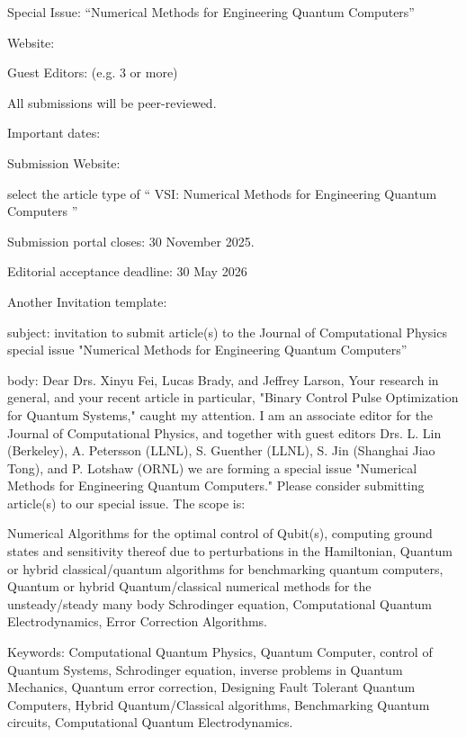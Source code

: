 \documentclass[]{article}
\begin{document}
Special Issue: ``Numerical Methods for Engineering Quantum Computers''
\par\noindent

Website: 
\par\noindent

Guest Editors: (e.g. 3 or more)
\par\noindent

All submissions will be peer-reviewed.
\par\noindent

Important dates:
\par\noindent

Submission Website: 
\par\noindent
select the article type of `` VSI: Numerical Methods for Engineering Quantum Computers '' 
\par\noindent

Submission portal closes: 30 November 2025.
\par\noindent

Editorial acceptance deadline: 30 May 2026
\par\noindent
Another Invitation template:
\par\noindent
subject: invitation to submit article(s) to the Journal of Computational Physics special issue "Numerical Methods for Engineering Quantum Computers''
\par\noindent
body: Dear Drs. Xinyu Fei, Lucas Brady, and Jeffrey Larson,
Your research in general, and your recent article in particular, "Binary Control Pulse Optimization for Quantum Systems," caught my attention.  I am an associate editor for the Journal of Computational Physics, and together with guest editors Drs.  L. Lin (Berkeley),   A. Petersson (LLNL), S. Guenther (LLNL), S. Jin (Shanghai Jiao Tong), and P. Lotshaw (ORNL) we are forming a special issue "Numerical Methods for Engineering Quantum Computers." Please consider submitting article(s) to our special issue.  The scope is:

Numerical Algorithms for the optimal control of Qubit(s), computing ground states and sensitivity thereof due to perturbations in the Hamiltonian, Quantum or hybrid classical/quantum algorithms for benchmarking quantum computers, Quantum or hybrid Quantum/classical numerical methods for the unsteady/steady many body Schrodinger equation, Computational Quantum Electrodynamics, Error Correction Algorithms.

Keywords:
Computational Quantum Physics, Quantum Computer, control of Quantum Systems, Schrodinger equation, inverse problems in Quantum Mechanics, Quantum error correction, Designing Fault Tolerant Quantum Computers, Hybrid Quantum/Classical algorithms, Benchmarking Quantum circuits, Computational Quantum Electrodynamics.
\end{document}
